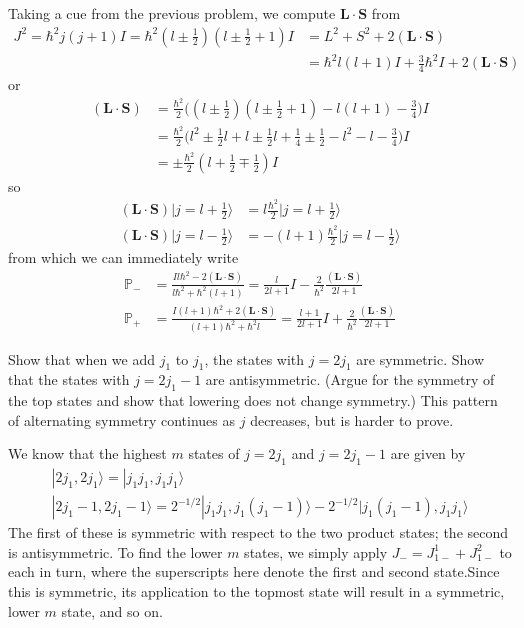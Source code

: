 \documentclass[../principles-of-quantum-mechanics.tex]{subfiles}
\begin{document}
\begin{questions}
		\begin{solution}
			Taking a cue from the previous problem, we compute $\mathbf{L}\cdot\mathbf{S}$ from
			\begin{align*}
				J^2 = \hbar^2j(j + 1)I = \hbar^2(l \pm \tfrac{1}{2})(l \pm \tfrac{1}{2} + 1)I &= L^2 + S^2 + 2(\mathbf{L}\cdot\mathbf{S}) \\
				&= \hbar^2l(l + 1)I + \tfrac{3}{4}\hbar^2I + 2(\mathbf{L}\cdot\mathbf{S})
			\end{align*}
			or
			\begin{align*}
				(\mathbf{L}\cdot\mathbf{S}) &= \frac{\hbar^2}{2}\Big((l \pm \tfrac{1}{2})(l \pm \tfrac{1}{2} + 1) - l(l + 1) - \tfrac{3}{4}\Big)I \\
				&= \frac{\hbar^2}{2}\Big(l^2 \pm \tfrac{1}{2}l + l \pm \tfrac{1}{2}l + \tfrac{1}{4} \pm \tfrac{1}{2} - l^2 - l - \tfrac{3}{4}\Big)I \\
				&= \pm\frac{\hbar^2}{2}(l + \tfrac{1}{2} \mp \tfrac{1}{2})I
			\end{align*}
			so
			\begin{align*}
				(\mathbf{L}\cdot\mathbf{S})|j=l+\tfrac{1}{2}\rangle &= l\frac{\hbar^2}{2}|j = l + \tfrac{1}{2}\rangle \\
				(\mathbf{L}\cdot\mathbf{S})|j=l-\tfrac{1}{2}\rangle &= -(l + 1)\frac{\hbar^2}{2}|j = l - \tfrac{1}{2}\rangle
			\end{align*}
			from which we can immediately write
			\begin{align*}
				\mathbb{P}_- &= \frac{Il\hbar^2 - 2(\mathbf{L}\cdot\mathbf{S})}{l\hbar^2 + \hbar^2(l + 1)} = \frac{l}{2l + 1}I - \frac{2}{\hbar^2}\frac{(\mathbf{L}\cdot\mathbf{S})}{2l + 1} \\
				\mathbb{P}_+ &= \frac{I(l + 1)\hbar^2 + 2(\mathbf{L}\cdot\mathbf{S})}{(l + 1)\hbar^2 + \hbar^2l} = \frac{l + 1}{2l + 1}I + \frac{2}{\hbar^2}\frac{(\mathbf{L}\cdot\mathbf{S})}{2l + 1}
			\end{align*}
		\end{solution}
		
		\question Show that when we add $j_1$ to $j_1$, the states with $j = 2j_1$ are symmetric. Show that the states with $j = 2j_1 - 1$ are antisymmetric. (Argue for the symmetry of the top states and show that lowering does not change symmetry.) This pattern of alternating symmetry continues as $j$ decreases, but is harder to prove.
		
		\begin{solution}
			We know that the highest $m$ states of $j = 2j_1$ and $j = 2j_1 - 1$ are given by
			\begin{gather*}
				|2j_1, 2j_1\rangle = |j_1j_1, j_1j_1\rangle \\
				|2j_1 - 1, 2j_1 - 1\rangle = 2^{-1/2}|j_1j_1, j_1(j_1-1)\rangle - 2^{-1/2}|j_1(j_1 - 1), j_1j_1\rangle
			\end{gather*}
			The first of these is symmetric with respect to the two product states; the second is antisymmetric. To find the lower $m$ states, we simply apply $J_- = J_{1-}^1 + J_{1-}^2$ to each in turn, where the superscripts here denote the first and second state.Since this is symmetric, its application to the topmost state will result in a symmetric, lower $m$ state, and so on.
			

\end{solution}
\end{questions}
\end{document}
